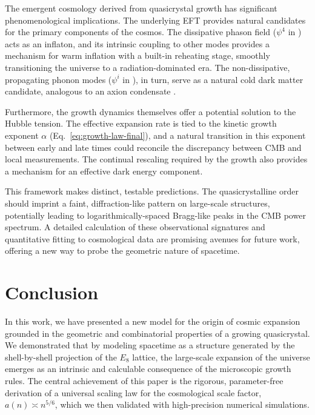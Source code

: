 \documentclass[universe,article,submit,pdftex,moreauthors]{Definitions/mdpi}
\begin{document}
The emergent cosmology derived from quasicrystal growth has significant phenomenological implications. The underlying EFT provides natural candidates for the primary components of the cosmos. The dissipative phason field ($\psi^4$ in \cite{Baggioli:2020haa,Amaral2024}) acts as an inflaton, and its intrinsic coupling to other modes provides a mechanism for warm inflation with a built-in reheating stage, smoothly transitioning the universe to a radiation-dominated era. The non-dissipative, propagating phonon modes ($\psi^i$ in \cite{Baggioli:2020haa,Amaral2024}), in turn, serve as a natural cold dark matter candidate, analogous to an axion condensate \cite{Preskill,Abbott,Baggioli2021}.

Furthermore, the growth dynamics themselves offer a potential solution to the Hubble tension. The effective expansion rate is tied to the kinetic growth exponent $\alpha$ (Eq.~\ref{eq:growth-law-final}), and a natural transition in this exponent between early and late times could reconcile the discrepancy between CMB and local measurements. The continual rescaling required by the growth also provides a mechanism for an effective dark energy component.

This framework makes distinct, testable predictions. The quasicrystalline order should imprint a faint, diffraction-like pattern on large-scale structures, potentially leading to logarithmically-spaced Bragg-like peaks in the CMB power spectrum. A detailed calculation of these observational signatures and quantitative fitting to cosmological data are promising avenues for future work, offering a new way to probe the geometric nature of spacetime.


\section{Conclusion}
\label{sec:conclusion}
In this work, we have presented a new model for the origin of cosmic expansion grounded in the geometric and combinatorial properties of a growing quasicrystal. We demonstrated that by modeling spacetime as a structure generated by the shell-by-shell projection of the $E_8$ lattice, the large-scale expansion of the universe emerges as an intrinsic and calculable consequence of the microscopic growth rules. The central achievement of this paper is the rigorous, parameter-free derivation of a universal scaling law for the cosmological scale factor, $a(n) \asymp n^{5/6}$, which we then validated with high-precision numerical simulations.
\end{document}
